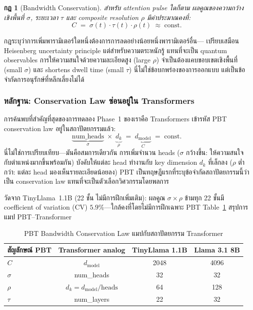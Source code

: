 \documentclass[12pt,a4paper]{article}
\newtheorem{law}{กฎ}[section]
\begin{document}
\begin{law}[Bandwidth Conservation]
สำหรับ attention pulse ใดก็ตาม ผลคูณของความกว้างเชิงพื้นที่ $\sigma$,
ระยะเวลา $\tau$ และ composite resolution $\rho$ มีค่าประมาณคงที่:
\begin{equation}
  C \;=\; \sigma(t)\cdot\tau(t)\cdot\rho(t) \;\approx\; \mathrm{const}.
  \label{eq:BCL}
\end{equation}
\end{law}

กฎระบุว่าการเพิ่มพารามิเตอร์ใดหนึ่งต้องการการลดอย่างน้อยหนึ่งพารามิเตอร์อื่น---
เปรียบเสมือน Heisenberg uncertainty principle แต่สำหรับความตระหนักรู้
แทนที่จะเป็น quantum observables การให้ความสนใจด้วยความละเอียดสูง (large $\rho$)
จำเป็นต้องแคบขอบเขตเชิงพื้นที่ (small $\sigma$) และ shortens dwell time (small $\tau$)
นี่ไม่ใช่ข้อบกพร่องของการออกแบบ แต่เป็นข้อจำกัดการอนุรักษ์ที่หลีกเลี่ยงไม่ได้

\subsubsection{หลักฐาน: Conservation Law ซ่อนอยู่ใน Transformers}

การค้นพบที่สำคัญที่สุดของการทดลอง Phase~1 ของเราคือ Transformers
เข้ารหัส PBT conservation law อยู่ในสถาปัตยกรรมแล้ว:
\begin{equation}
  \underbrace{\text{num\_heads}}_{\sigma}
  \;\times\;
  \underbrace{d_k}_{\rho}
  \;=\;
  \underbrace{d_{\mathrm{model}}}_{C}
  \;=\; \text{const}.
  \label{eq:transformer_BCL}
\end{equation}
นี่ไม่ใช่การเปรียบเทียบ---มันคือสมการเดียวกัน การเพิ่มจำนวน heads
($\sigma$ กว้างขึ้น: ให้ความสนใจกับตำแหน่งมากขึ้นพร้อมกัน)
บังคับให้แต่ละ head ทำงานกับ key dimension $d_k$ ที่เล็กลง
($\rho$ ต่ำกว่า: แต่ละ head มองเห็นรายละเอียดน้อยลง)
PBT เป็นทฤษฎีแรกที่ระบุข้อจำกัดสถาปัตยกรรมนี้ว่าเป็น conservation law
แทนที่จะเป็นตัวเลือกวิศวกรรมโดยพลการ

วัดจาก TinyLlama~1.1B (22 ชั้น ไม่มีการฝึกเพิ่มเติม):
ผลคูณ $\sigma\!\times\!\rho$ ข้ามทุก 22 ชั้นมี coefficient of variation (CV)
$\mathbf{5.9\%}$---ใกล้คงที่โดยไม่มีการฝึกเฉพาะ PBT
Table~\ref{tab:BCL_mapping} สรุปการแมป PBT--Transformer

\begin{table}[!htbp]
\centering
\caption{PBT Bandwidth Conservation Law แมปกับสถาปัตยกรรม Transformer}
\label{tab:BCL_mapping}
\small
\begin{tabular}{@{}lccc@{}}
\toprule
\textbf{สัญลักษณ์ PBT} & \textbf{Transformer analog}
  & \textbf{TinyLlama 1.1B} & \textbf{Llama 3.1 8B} \\
\midrule
$C$ & $d_{\mathrm{model}}$          & 2048 & 4096 \\
$\sigma$ & num\_heads               & 32   & 32   \\
$\rho$   & $d_k = d_{\mathrm{model}}/\mathrm{heads}$ & 64 & 128 \\
$\tau$   & num\_layers              & 22   & 32   \\
\bottomrule
\end{tabular}
\end{table}
\end{document}

